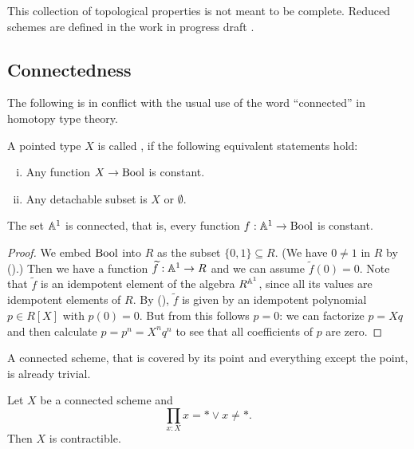 
This collection of topological properties is not meant to be complete.
Reduced schemes are defined in the work in progress draft \cite{etale-draft}.

\subsection{Connectedness}
The following is in conflict with the usual use of the word ``connected'' in homotopy type theory.

\begin{definition}%
  \label{connected}
  A pointed type $X$ is called ,
  if the following equivalent statements hold:
  \begin{enumerate}[(i)]
  \item Any function $X\to \mathrm{Bool}$ is constant.
  \item Any detachable subset is $X$ or $\emptyset$.
 \end{enumerate}
\end{definition}

\begin{proposition}%
  \label{A1-connected}
  The set $\mathbb{A}^1$ is connected, that is,
  every function $f : \mathbb{A}^1 \to \mathrm{Bool}$ is constant.
\end{proposition}

\begin{proof}
  We embed $\mathrm{Bool}$ into $R$ as the subset $\{0, 1\} \subseteq R$.
  (We have $0 \neq 1$ in $R$ by ().)
  Then we have a function $\widetilde{f} : \mathbb{A}^1 \to R$
  and we can assume $\widetilde{f}(0) = 0$.
  Note that $\widetilde{f}$ is an idempotent element of the algebra $R^{\mathbb{A}^1}$,
  since all its values are idempotent elements of $R$.
  By (),
  $\widetilde{f}$ is given by an idempotent polynomial $p \in R[X]$
  with $p(0) = 0$.
  But from this follows $p = 0$:
  we can factorize $p = X q$
  and then calculate $p = p^n = X^n q^n$
  to see that all coefficients of $p$ are zero.
\end{proof}

A connected scheme, that is covered by its point and everything except the point,
is already trivial.

\begin{corollary}%
  \label{connected-to-contractible}
  Let $X$ be a connected scheme and 
  \[\prod_{x:X}x=* \vee x\neq *.\]
  Then $X$ is contractible.
\end{corollary}

